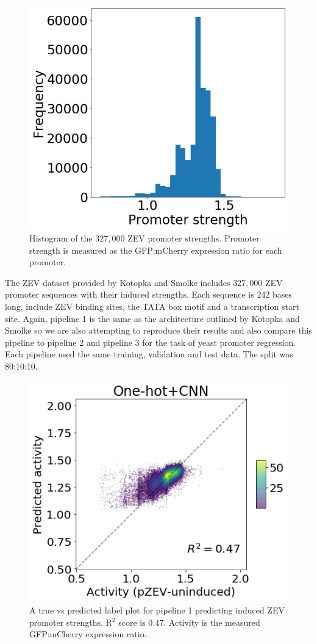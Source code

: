 \documentclass{article}
\begin{document}
\begin{figure}[H]
    \centering
    \includegraphics[width=0.5\linewidth]{images/hist.png}
    \caption{Histogram of the $327,000$ ZEV promoter strengths. Promoter strength is measured as the GFP:mCherry expression ratio for each promoter.}
    \label{fig:hist}
\end{figure}

The ZEV dataset provided by Kotopka and Smolke \cite{smolke2020promoter} includes $327,000$ ZEV promoter sequences with their induced strengths. Each sequence is 242 bases long, include ZEV binding sites, the TATA box motif and a transcription start site. Again, pipeline 1 is the same as the architecture outlined by Kotopka and Smolke \cite{smolke2020promoter} so we are also attempting to reproduce their results and also compare this pipeline to pipeline 2 and pipeline 3 for the task of yeast promoter regression. Each pipeline used the same training, validation and test data. The split was 80:10:10.

\begin{figure}[H]
    \centering
    \includegraphics[width=0.5\linewidth]{images/cnn.png}
    \caption{A true vs predicted label plot for pipeline 1 predicting induced ZEV promoter strengths. R$^2$ score is $0.47$. Activity is the measured GFP:mCherry expression ratio.}
    \label{fig:cnn}
\end{figure}
\end{document}
